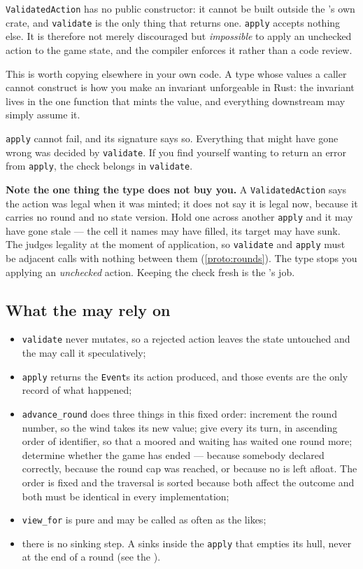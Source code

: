 \documentclass{article}
\begin{document}
\texttt{ValidatedAction} has no public constructor: it cannot be built outside the \chart's own
crate, and \texttt{validate} is the only thing that returns one. \texttt{apply} accepts nothing
else. It is therefore not merely discouraged but \emph{impossible} to apply an unchecked action to
the game state, and the compiler enforces it rather than a code review.

This is worth copying elsewhere in your own code. A type whose values a caller cannot construct is
how you make an invariant unforgeable in Rust: the invariant lives in the one function that mints
the value, and everything downstream may simply assume it.

\texttt{apply} cannot fail, and its signature says so. Everything that might have gone wrong was
decided by \texttt{validate}. If you find yourself wanting to return an error from \texttt{apply},
the check belongs in \texttt{validate}.

\textbf{Note the one thing the type does not buy you.} A \texttt{ValidatedAction} says the action
was legal when it was minted; it does not say it is legal now, because it carries no round and no
state version. Hold one across another \texttt{apply} and it may have gone stale --- the cell it
names may have filled, its target may have sunk. The \MD{} judges legality at the moment of
application, so \texttt{validate} and \texttt{apply} must be adjacent calls with nothing between
them (\cref{proto:rounds}). The type stops you applying an \emph{unchecked} action. Keeping the
check fresh is the \admiralty's job.

\subsection{What the \admiralty{} may rely on}

\begin{itemize}
    \item \texttt{validate} never mutates, so a rejected action leaves the state untouched and the
      \admiralty{} may call it speculatively;
    \item \texttt{apply} returns the \texttt{Event}s its action produced, and those events are the
      only record of what happened;
    \item \texttt{advance\_round} does three things in this fixed order: increment the round
      number, so the wind takes its new value; give every \island{} its turn, in ascending order
      of identifier, so that a \ship{} moored and waiting has waited one round more; determine
      whether the game has ended --- because somebody declared correctly, because the round cap
      was reached, or because no \ship{} is left afloat. The order is fixed and the traversal is
      sorted because both affect the outcome and both must be identical in every implementation;
    \item \texttt{view\_for} is pure and may be called as often as the \admiralty{} likes;
    \item there is no sinking step. A \ship{} sinks inside the \texttt{apply} that empties its
      hull, never at the end of a round (see the \MD).
\end{itemize}
\end{document}
